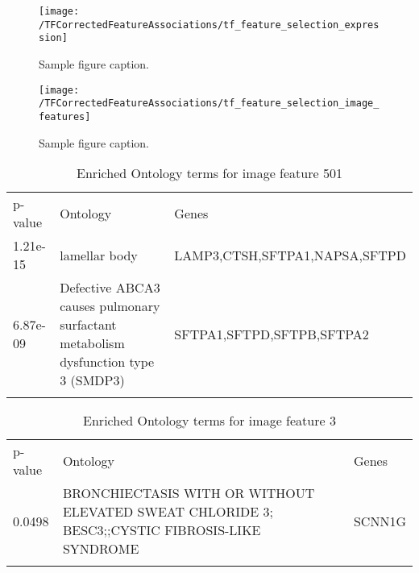 \documentclass{article}
\begin{document}
\begin{figure}[H]
  \centering
    \texttt{[image: /TFCorrectedFeatureAssociations/tf\_feature\_selection\_expression]} 
  \caption{Sample figure caption.}
\end{figure}

\begin{figure}[H]
  \centering
    \texttt{[image: /TFCorrectedFeatureAssociations/tf\_feature\_selection\_image\_features]} 
  \caption{Sample figure caption.}
\end{figure}



\begin{table}[H]
\caption{Enriched Ontology terms for image feature 501}
\label{tab:image_feature_pcs_and_tfs}       %

\begin{tabular}{p{2cm}p{6cm}p{6cm}}
\hline\noalign{\smallskip}
p-value & Ontology & Genes  \\
1.21e-15 & lamellar body & LAMP3,CTSH,SFTPA1,NAPSA,SFTPD  \\
6.87e-09 & Defective ABCA3 causes pulmonary surfactant metabolism dysfunction type 3 (SMDP3) & SFTPA1,SFTPD,SFTPB,SFTPA2 \\


\noalign{\smallskip}\hline\noalign{\smallskip}
\end{tabular}
\end{table}

\begin{table}[H]
\caption{Enriched Ontology terms for image feature 3}
\label{tab:image_feature_pcs_and_tfs}       %

\begin{tabular}{p{2cm}p{6cm}p{6cm}}
\hline\noalign{\smallskip}
p-value & Ontology & Genes  \\
0.0498 & BRONCHIECTASIS WITH OR WITHOUT ELEVATED SWEAT CHLORIDE 3; BESC3;;CYSTIC FIBROSIS-LIKE SYNDROME & SCNN1G \\


\noalign{\smallskip}\hline\noalign{\smallskip}
\end{tabular}
\end{table}
\end{document}
